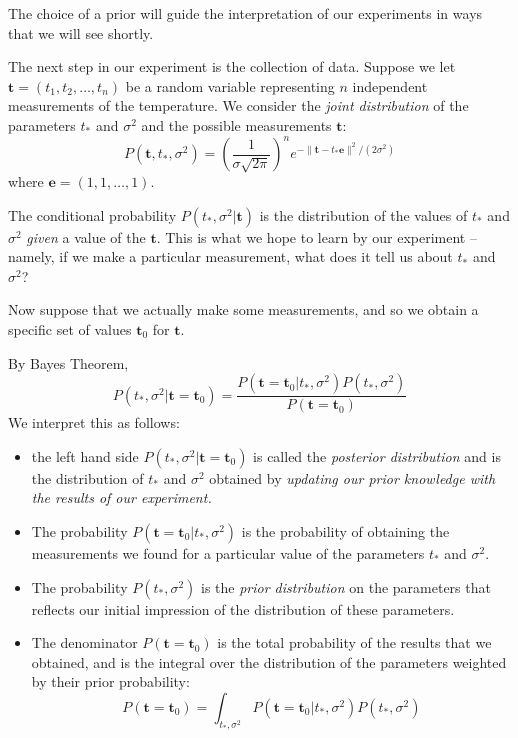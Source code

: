 \documentclass[
  oneside]{scrbook}
\providecommand{\tightlist}{%
  \setlength{\itemsep}{0pt}\setlength{\parskip}{0pt}}
\begin{document}
The choice of a prior will guide the interpretation of our experiments
in ways that we will see shortly.

The next step in our experiment is the collection of data. Suppose we
let \(\mathbf{t}=(t_1,t_2,\ldots, t_n)\) be a random variable
representing \(n\) independent measurements of the temperature. We
consider the \emph{joint distribution} of the parameters \(t_*\) and
\(\sigma^2\) and the possible measurements \(\mathbf{t}\): \[
P(\mathbf{t},t_*,\sigma^2)=\left(\frac{1}{\sigma\sqrt{2\pi}}\right)^{n}e^{-\|\mathbf{t}-t_*\mathbf{e}\|^2/(2\sigma^2)}
\] where \(\mathbf{e}=(1,1,\ldots, 1)\).

The conditional probability \(P(t_{*},\sigma^2|\mathbf{t})\) is the
distribution of the values of \(t_*\) and \(\sigma^2\) \emph{given} a
value of the \(\mathbf{t}\). This is what we hope to learn by our
experiment -- namely, if we make a particular measurement, what does it
tell us about \(t_*\) and \(\sigma^2\)?

Now suppose that we actually make some measurements, and so we obtain a
specific set of values \(\mathbf{t}_0\) for \(\mathbf{t}\).

By Bayes Theorem, \[
P(t_{*},\sigma^2|\mathbf{t}=\mathbf{t}_0) = \frac{P(\mathbf{t}=\mathbf{t}_0|t_{*},\sigma^2)P(t_{*},\sigma^2)}{P(\mathbf{t}=\mathbf{t}_0)}
\] We interpret this as follows:

\begin{itemize}
\tightlist
\item
  the left hand side \(P(t_{*},\sigma^2|\mathbf{t}=\mathbf{t}_0)\) is
  called the \emph{posterior distribution} and is the distribution of
  \(t_{*}\) and \(\sigma^2\) obtained by \emph{updating our prior
  knowledge with the results of our experiment.}
\item
  The probability \(P(\mathbf{t}=\mathbf{t}_{0}|t_{*},\sigma^2)\) is the
  probability of obtaining the measurements we found for a particular
  value of the parameters \(t_{*}\) and \(\sigma^2\).
\item
  The probability \(P(t_{*},\sigma^2)\) is the \emph{prior distribution}
  on the parameters that reflects our initial impression of the
  distribution of these parameters.
\item
  The denominator \(P(\mathbf{t}=\mathbf{t}_{0})\) is the total
  probability of the results that we obtained, and is the integral over
  the distribution of the parameters weighted by their prior
  probability: \[
  P(\mathbf{t}=\mathbf{t}_{0})=\int_{t_{*},\sigma^2}P(\mathbf{t}=\mathbf{t}_{0}|t_{*},\sigma^2)P(t_{*},\sigma^2)
  \]
\end{itemize}
\end{document}

